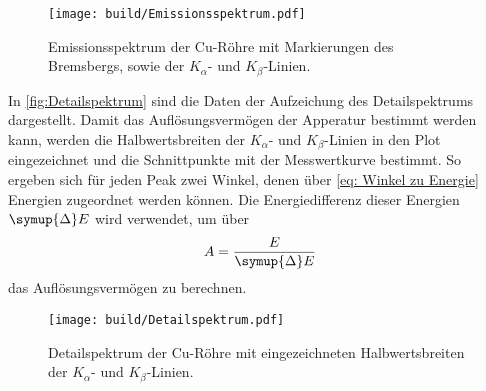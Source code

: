 \begin{figure}[H]
  \centering
  \texttt{[image: build/Emissionsspektrum.pdf]}
  \caption{Emissionsspektrum der Cu-Röhre mit Markierungen des Bremsbergs, sowie der $K_{\alpha}$- und $K_{\beta}$-Linien.}
  \label{fig:Emissionsspektrum}
\end{figure}

In \autoref{fig:Detailspektrum} sind die Daten der Aufzeichung des Detailspektrums dargestellt. Damit das Auflösungsvermögen
der Apperatur bestimmt werden kann, werden die Halbwertsbreiten der $K_{\alpha}$- und $K_{\beta}$-Linien in den Plot eingezeichnet 
und die Schnittpunkte mit der Messwertkurve bestimmt. So ergeben sich für jeden Peak zwei Winkel, denen über \eqref{eq: Winkel zu Energie}
Energien zugeordnet werden können. Die Energiedifferenz dieser Energien $\symup{\Delta}E$ wird verwendet, um über
\begin{equation*}
  A = \frac{E}{\symup{\Delta}E}
\end{equation*}
das Auflösungsvermögen zu berechnen. 

\begin{figure}[H]
  \centering
  \texttt{[image: build/Detailspektrum.pdf]}
  \caption{Detailspektrum der Cu-Röhre mit eingezeichneten Halbwertsbreiten der $K_{\alpha}$- und $K_{\beta}$-Linien.}
  \label{fig:Detailspektrum}
\end{figure}